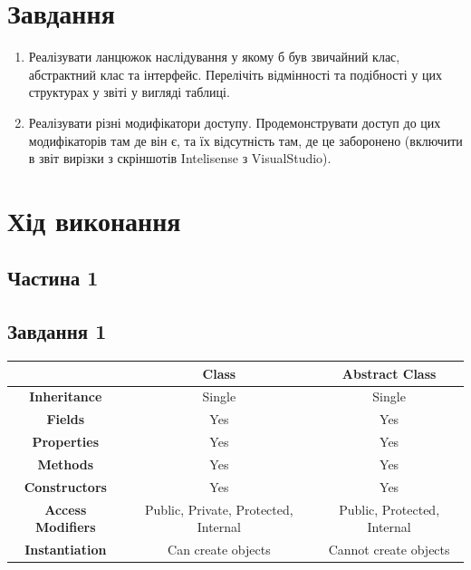 \documentclass[oneside,14pt]{extarticle}
\begin{document}
\begin{normalsize}
	\section*{Завдання}
	\begin{enumerate}
		\item Реалізувати ланцюжок наслідування у якому б був звичайний клас,
		абстрактний клас та інтерфейс. Перелічіть відмінності та подібності у цих
		структурах у звіті у вигляді таблиці.
		
		\item Реалізувати різні модифікатори доступу. Продемонструвати доступ до цих модифікаторів там де він є, та їх відсутність там, де це заборонено
		(включити в звіт вирізки з скріншотів Intelisense з VisualStudio).
	\end{enumerate}

	\section*{Хід виконання}
	\subsection*{Частина 1}
	\subsection*{Завдання 1}	
	\begin{table}[H]
		\centering
		\begin{tabular}{ |c|c|c| }
			\hline
			& \textbf{Class} & \textbf{Abstract Class} \\ 
			\hline
			\textbf{Inheritance} & Single & Single \\ 
			\hline
			\textbf{Fields} & Yes & Yes \\ 
			\hline
			\textbf{Properties} & Yes & Yes \\ 
			\hline
			\textbf{Methods} & Yes & Yes \\ 
			\hline
			\textbf{Constructors} & Yes & Yes \\ 
			\hline
			\textbf{Access Modifiers} & Public, Private, Protected, Internal & Public, Protected, Internal \\ 
			\hline
			\textbf{Instantiation} & Can create objects & Cannot create objects \\ 
			\hline
		\end{tabular}
	\end{table}
	

\end{normalsize}
\end{document}

